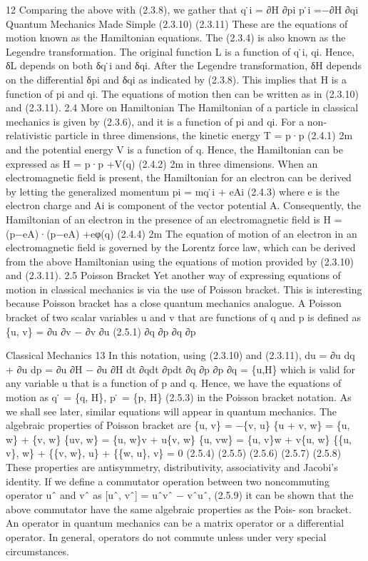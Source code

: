 \documentclass[
  9pt,
]{extbook}
\begin{document}
12
Comparing the above with (2.3.8), we gather that
q ̇i = ∂H ∂pi
p ̇i =−∂H ∂qi
Quantum Mechanics Made Simple
(2.3.10) (2.3.11)
These are the equations of motion known as the Hamiltonian equations.
The (2.3.4) is also known as the Legendre transformation. The original function L is a function of q ̇i, qi. Hence, δL depends on both δq ̇i and δqi. After the Legendre transformation, δH depends on the differential δpi and δqi as indicated by (2.3.8). This implies that H is a function of pi and qi. The equations of motion then can be written as in (2.3.10) and (2.3.11).
2.4 More on Hamiltonian
The Hamiltonian of a particle in classical mechanics is given by (2.3.6), and it is a function of pi and qi. For a non-relativistic particle in three dimensions, the kinetic energy
T = p·p (2.4.1) 2m
and the potential energy V is a function of q. Hence, the Hamiltonian can be expressed as H = p·p +V(q) (2.4.2)
2m
in three dimensions. When an electromagnetic field is present, the Hamiltonian for an electron
can be derived by letting the generalized momentum
pi = mq ̇i + eAi (2.4.3)
where e is the electron charge and Ai is component of the vector potential A. Consequently, the Hamiltonian of an electron in the presence of an electromagnetic field is
H = (p−eA)·(p−eA) +eφ(q) (2.4.4) 2m
The equation of motion of an electron in an electromagnetic field is governed by the Lorentz force law, which can be derived from the above Hamiltonian using the equations of motion provided by (2.3.10) and (2.3.11).
2.5 Poisson Bracket
Yet another way of expressing equations of motion in classical mechanics is via the use of Poisson bracket. This is interesting because Poisson bracket has a close quantum mechanics analogue. A Poisson bracket of two scalar variables u and v that are functions of q and p is defined as
\{u, v\} = ∂u ∂v − ∂v ∂u (2.5.1) ∂q ∂p ∂q ∂p

Classical Mechanics 13 In this notation, using (2.3.10) and (2.3.11),
du = ∂u dq + ∂u dp = ∂u ∂H − ∂u ∂H dt ∂qdt ∂pdt ∂q ∂p ∂p ∂q
= \{u,H\}
which is valid for any variable u that is a function of p and q. Hence, we have the equations
of motion as
q ̇ = \{q, H\}, p ̇ = \{p, H\} (2.5.3)
in the Poisson bracket notation. As we shall see later, similar equations will appear in quantum mechanics.
The algebraic properties of Poisson bracket are
\{u, v\} = −\{v, u\}
\{u + v, w\} = \{u, w\} + \{v, w\}
\{uv, w\} = \{u, w\}v + u\{v, w\}
\{u, vw\} = \{u, v\}w + v\{u, w\}
\{\{u, v\}, w\} + \{\{v, w\}, u\} + \{\{w, u\}, v\} = 0
(2.5.4) (2.5.5) (2.5.6) (2.5.7) (2.5.8)
These properties are antisymmetry, distributivity, associativity and Jacobi's identity.
If we define a commutator operation between two noncommuting operator uˆ and vˆ as
{[}uˆ, vˆ{]} = uˆvˆ − vˆuˆ, (2.5.9)
it can be shown that the above commutator have the same algebraic properties as the Pois- son bracket. An operator in quantum mechanics can be a matrix operator or a differential operator. In general, operators do not commute unless under very special circumstances.
\end{document}
